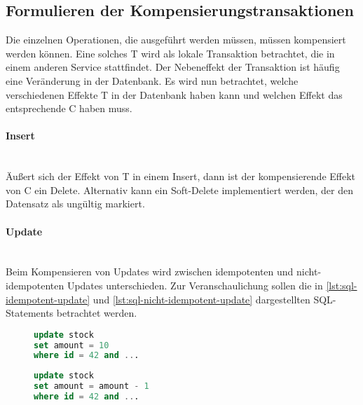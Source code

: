 \subsection{Formulieren der Kompensierungstransaktionen}
Die einzelnen Operationen, die ausgeführt werden müssen, müssen kompensiert werden können. Eine solches T wird als lokale Transaktion betrachtet, die in einem anderen Service stattfindet. Der Nebeneffekt der Transaktion ist häufig eine Veränderung in der Datenbank. Es wird nun betrachtet, welche verschiedenen Effekte T in der Datenbank haben kann und welchen Effekt das entsprechende C haben muss.

\paragraph*{Insert} \mbox{}\\
Äußert sich der Effekt von T in einem Insert, dann ist der kompensierende Effekt von C ein Delete. Alternativ kann ein Soft-Delete implementiert werden, der den Datensatz als ungültig markiert.

\paragraph*{Update} \mbox{}\\
Beim Kompensieren von Updates wird zwischen idempotenten und nicht-idempotenten Updates unterschieden. Zur Veranschaulichung sollen die in \cref{lst:sql-idempotent-update} und \cref{lst:sql-nicht-idempotent-update} dargestellten SQL-Statements betrachtet werden. 

\begin{figure}[!htbp]
\centering
\begin{minipage}{.42\textwidth}
	\begin{lstlisting}[language=SQL, breaklines=true, tabsize=2, showstringspaces=false, frame=single, basicstyle=\small, label = {lst:sql-idempotent-update}, caption={SQL Skript für ein idempotentes Update}, captionpos=b]
update stock 
set amount = 10
where id = 42 and ...
	\end{lstlisting}
\end{minipage}
\hspace{1.5cm}
\begin{minipage}{.42\textwidth}
	\begin{lstlisting}[language=SQL, breaklines=true, tabsize=2, showstringspaces=false, frame=single, basicstyle=\small, label = {lst:sql-nicht-idempotent-update}, caption={SQL Skript für ein nicht-idempotentes Update}, captionpos=b]
update stock 
set amount = amount - 1
where id = 42 and ...
	\end{lstlisting}
\end{minipage}
\end{figure}
\FloatBarrier

